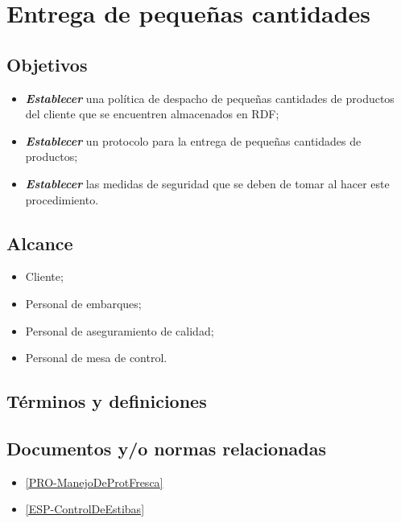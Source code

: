 \thispagestyle{formato-PI}
\renewcommand{\MayorVer}{2}
\renewcommand{\MenorVer}{0}
\renewcommand{\FechaPub}{2023--01}
\renewcommand{\TipoID}{PRO}

\renewcommand{\Titulo}{Entrega de pequeñas cantidades}
\section{\Titulo}
\renewcommand{\Codigo}{\Prog--\thesection--\TipoID}

\subsection{Objetivos}

\begin{itemize}
	\item \emph{\textbf{Establecer}} una política de despacho de pequeñas cantidades de productos del cliente que se encuentren almacenados en RDF;
	\item \emph{\textbf{Establecer}} un protocolo para la entrega de pequeñas cantidades de productos;
	\item \emph{\textbf{Establecer}} las medidas de seguridad que se deben de tomar al hacer este procedimiento.
\end{itemize}

\subsection{Alcance}

\begin{itemize}
	\item Cliente;
	\item Personal de embarques;
	\item Personal de aseguramiento de calidad;
	\item Personal de mesa de control.
\end{itemize}

\subsection{Términos y definiciones}

\begin{description}
\end{description}

\subsection{Documentos y/o normas relacionadas}
\begin{itemize}
	\item \cref{PRO-ManejoDeProtFresca}
	\item \cref{ESP-ControlDeEstibas}
\end{itemize}

